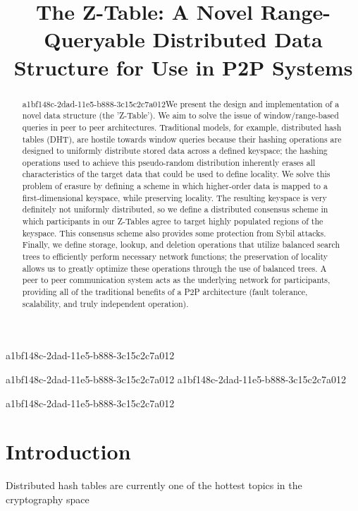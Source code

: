 \documentclass[12pt]{article}
\title{The Z-Table: A Novel Range-Queryable Distributed Data Structure for Use in P2P Systems}
\begin{document}
a1bf148c-2dad-11e5-b888-3c15c2c7a012\maketitle
a1bf148c-2dad-11e5-b888-3c15c2c7a012
a1bf148c-2dad-11e5-b888-3c15c2c7a012\begin{abstract}
a1bf148c-2dad-11e5-b888-3c15c2c7a012We present the design and implementation of a novel data structure (the 'Z-Table'). We aim to solve the issue of window/range-based queries in peer to peer architectures. Traditional models, for example,  distributed hash tables (DHT), are hostile towards window queries because their hashing operations are designed to uniformly distribute stored data across a defined keyspace; the hashing operations used to achieve this pseudo-random distribution inherently erases all characteristics of the target data that could be used to define locality. We solve this problem of erasure by defining a scheme in which higher-order data is mapped to a first-dimensional keyspace, while preserving locality. The resulting keyspace is very definitely not uniformly distributed, so we define a distributed consensus scheme in which participants in our Z-Tables agree to target highly populated regions of the keyspace. This consensus scheme also provides some protection from Sybil attacks. Finally, we define storage, lookup, and deletion operations that utilize balanced search trees to efficiently perform necessary network functions; the preservation of locality allows us to greatly optimize these operations through the use of balanced trees. A peer to peer communication system acts as the underlying network for participants, providing all of the traditional benefits of a P2P architecture (fault tolerance, scalability, and truly independent operation).
\end{abstract}


a1bf148c-2dad-11e5-b888-3c15c2c7a012\newpage
\section{Introduction}
Distributed hash tables are currently one of the hottest topics in the cryptography space~\cite{Stoica:2001dj,Rowstron:2001ea,Ratnasamy:2001wn}

\printbibliography
\end{document}
